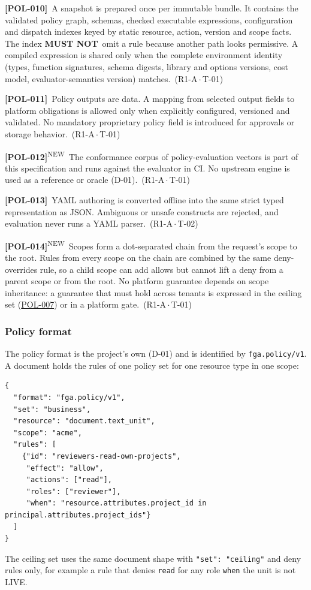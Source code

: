 \documentclass[11pt,a4paper]{article}
\newcommand{\mustnot}{\textbf{MUST NOT}}
\newcommand{\code}[1]{{\small\nolinkurl{#1}}}
\newcommand{\rr}[1]{\hyperlink{req:#1}{#1}}
\newcommand{\reqtag}[2]{{\footnotesize\color{accent}(#1\,$\cdot$\,#2)}}
\newcommand{\req}[4]{\par\noindent\hypertarget{req:#1}{\textbf{[#1]}}\ #4\ \reqtag{#2}{#3}\par}
\newcommand{\reqn}[4]{\par\noindent\hypertarget{req:#1}{\textbf{[#1]}}\textsuperscript{\color{accent}\tiny NEW}\ #4\ \reqtag{#2}{#3}\par}
\begin{document}
\req{POL-010}{R1-A}{T-01}{A snapshot is prepared once per immutable bundle. It contains the validated policy graph, schemas, checked executable expressions, configuration and dispatch indexes keyed by static resource, action, version and scope facts. The index \mustnot\ omit a rule because another path looks permissive. A compiled expression is shared only when the complete environment identity (types, function signatures, schema digests, library and options versions, cost model, evaluator-semantics version) matches.}
\req{POL-011}{R1-A}{T-01}{Policy outputs are data. A mapping from selected output fields to platform obligations is allowed only when explicitly configured, versioned and validated. No mandatory proprietary policy field is introduced for approvals or storage behavior.}
\reqn{POL-012}{R1-A}{T-01}{The conformance corpus of policy-evaluation vectors is part of this specification and runs against the evaluator in CI. No upstream engine is used as a reference or oracle (D-01).}
\req{POL-013}{R1-A}{T-02}{YAML authoring is converted offline into the same strict typed representation as JSON. Ambiguous or unsafe constructs are rejected, and evaluation never runs a YAML parser.}
\reqn{POL-014}{R1-A}{T-01}{Scopes form a dot-separated chain from the request's scope to the root. Rules from every scope on the chain are combined by the same deny-overrides rule, so a child scope can add allows but cannot lift a deny from a parent scope or from the root. No platform guarantee depends on scope inheritance: a guarantee that must hold across tenants is expressed in the ceiling set (\rr{POL-007}) or in a platform gate.}

\subsubsection{Policy format}\label{sec:policyformat}
The policy format is the project's own (D-01) and is identified by \code{fga.policy/v1}. A document holds the rules of one policy set for one resource type in one scope:
\begin{lstlisting}
{
  "format": "fga.policy/v1",
  "set": "business",
  "resource": "document.text_unit",
  "scope": "acme",
  "rules": [
    {"id": "reviewers-read-own-projects",
     "effect": "allow",
     "actions": ["read"],
     "roles": ["reviewer"],
     "when": "resource.attributes.project_id in principal.attributes.project_ids"}
  ]
}
\end{lstlisting}
The ceiling set uses the same document shape with \code{"set": "ceiling"} and deny rules only, for example a rule that denies \code{read} for any role \code{when} the unit is not LIVE.
\end{document}
